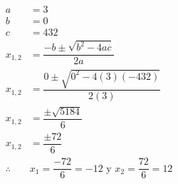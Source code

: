{\begin{solutionbox}{11cm}
\begin{multicols}{2}
\[\begin{array}{rl}
                    a          & =3                                                        \\
                    b          & =0                                                        \\
                    c          & =432                                                      \\
                    x_{1,2}    & = \dfrac{-b\pm\sqrt{b^2-4ac}}{2a}                         \\[2em]
                    x_{1,2}    & = \dfrac{0\pm\sqrt{0^2-4(3)(-432)}}{2(3)}                 \\[2em]
                    x_{1,2}    & = \dfrac{\pm\sqrt{5184}}{6}                               \\[2em]
                    x_{1,2}    & = \dfrac{\pm72}{6}                                        \\[2em]
                    \therefore & x_1 =\dfrac{-72}{6}=-12 \text{ y }  x_2 =\dfrac{72}{6}=12 \\[2em]
                \end{array}
            \]
        \end{multicols}
    \end{solutionbox}
}